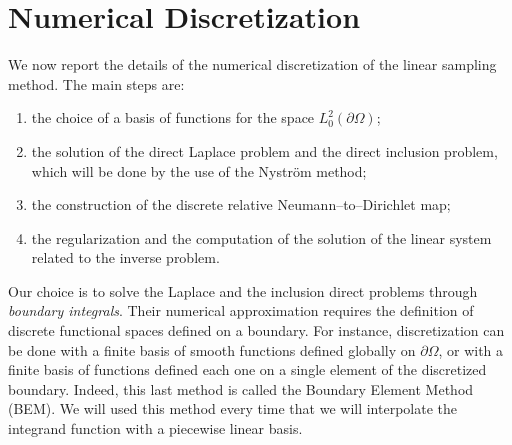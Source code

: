 \documentclass[10pt, a4paper, twoside, openright]{book}
\theoremstyle{definition}
\theoremstyle{plain}
\theoremstyle{plain}
\theoremstyle{plain}
\theoremstyle{plain}
\theoremstyle{plain}
\theoremstyle{plain}
\theoremstyle{plain}
\theoremstyle{plain}
\begin{document}
\section{Numerical Discretization}
We now report the details of the numerical discretization of the linear sampling method. The main 
steps are:
\begin{enumerate}
 \item the choice of a basis of functions for the space $L^2_0(\partial \Omega)$;
 \item the solution of the direct Laplace problem and the direct inclusion problem, 
 which will be done by the use of the Nystr\"om method;
 \item the construction of the discrete relative Neumann--to--Dirichlet map;
 \item the regularization and the computation of the solution of the linear system related 
 to the inverse problem.
\end{enumerate}
Our choice is to solve the Laplace and the inclusion direct problems  
through \emph{boundary integrals}. Their numerical approximation requires the definition of discrete 
functional spaces defined on a boundary. 
For instance, discretization can be done with a finite basis of smooth functions defined globally 
on $\partial \Omega$, or with a finite basis of functions defined each one on a single element of 
the discretized boundary. Indeed, this last method is called the Boundary Element Method (BEM). 
We will used this method every time that we will interpolate the integrand function with a piecewise 
linear basis.
\end{document}
